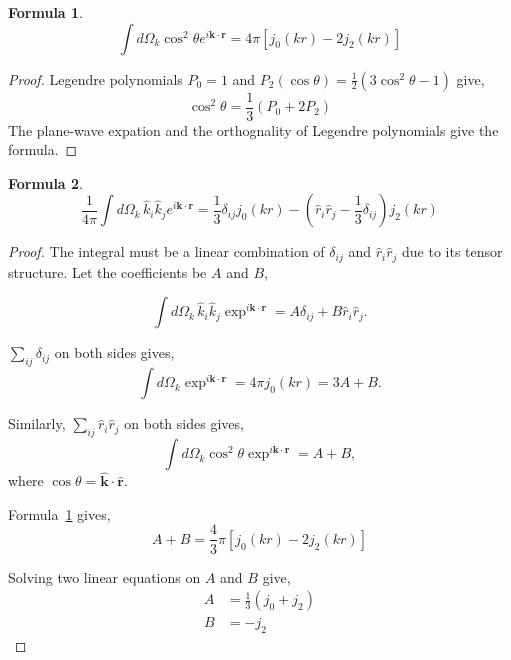\documentclass[a4paper,11pt]{article}
\newtheorem{formula}{Formula}[section]
\begin{document}
\begin{formula}
  \label{formula:cos2}
  \begin{equation}
    \int d\Omega_k \cos^2 \theta e^{i\bm{k}\cdot\bm{r}}
    =  4\pi \left[ j_0(kr) - 2 j_2(kr) \right]
  \end{equation}
\end{formula}

\begin{proof}
  Legendre polynomials $P_0 = 1$ and $P_2(\cos\theta) = \frac{1}{2} (3 \cos^2\theta - 1)$ give,
  \begin{equation}
    \cos^2 \theta = \frac{1}{3}( P_0 + 2P_2 )
  \end{equation}
  The plane-wave expation and the orthognality of Legendre polynomials give the formula.
\end{proof}

%
%
\begin{formula}
  \label{formula-moment}
  \begin{equation}
    \frac{1}{4\pi}\int d\Omega_k \, \hat{k}_i \hat{k}_j e^{i\bm{k}\cdot\bm{r}}
    = \frac{1}{3} \delta_{ij} j_0(kr) - \left(\hat{r}_i \hat{r}_j - \frac{1}{3} \delta_{ij} \right) j_2(kr)
  \end{equation}
\end{formula}

\begin{proof}
  The integral must be a linear combination of $\delta_{ij}$ and
  $\hat{r}_i \hat{r}_j$ due to its tensor structure. Let the coefficients
  be $A$ and $B$,

  \begin{equation}
    \int\! d\Omega_k \, \hat{k}_i \hat{k}_j \exp^{i\bm{k}\cdot\bm{r}}
    = A \delta_{ij} + B \hat{r}_i \hat{r}_j.
  \end{equation}

   $\sum_{ij} \delta_{ij}$ on both sides gives,
  \begin{equation}
    \int \! d\Omega_k \exp^{i\bm{k}\cdot\bm{r}} = 4 \pi j_0(kr)
    = 3 A + B.
  \end{equation}

   Similarly, $\sum_{ij} \hat{r}_i \hat{r}_j$ on both sides gives,
  \begin{equation}
    \int \! d\Omega_k \cos^2 \theta \exp^{i\bm{k}\cdot\bm{r}}
      = A + B,
  \end{equation}
  where $\cos\theta = \hat{\bm{k}} \cdot \hat{\bm{r}}$.

  Formula~\ref{formula:cos2} gives,
  \begin{equation}
    A + B = \frac{4}{3}\pi \left[ j_0(kr) - 2 j_2(kr) \right]
  \end{equation}

  Solving two linear equations on $A$ and $B$ give,
  \begin{align}
    A &= \frac{1}{3} (j_0 + j_2)\\
    B &= - j_2
  \end{align}    
\end{proof}
\end{document}

